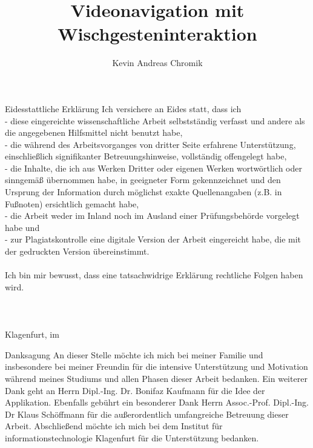 \documentclass[11pt,a4paper]{report}
\begin{document}
\title{Videonavigation mit Wischgesteninteraktion}
\author{Kevin Andreas Chromik}

\maketitle
{}
\begin{preface}{Eidesstattliche Erklärung}
Ich versichere an Eides statt, dass ich\\
- diese eingereichte wissenschaftliche Arbeit selbstständig verfasst und andere als die angegebenen Hilfsmittel nicht benutzt habe,\\
- die während des Arbeitsvorganges von dritter Seite erfahrene Unterstützung, einschließlich signifikanter Betreuungshinweise, vollständig offengelegt habe,\\
- die Inhalte, die ich aus Werken Dritter oder eigenen Werken wortwörtlich oder sinngemäß übernommen habe, in geeigneter Form gekennzeichnet und den Ursprung der Information durch möglichst exakte Quellenangaben (z.B. in Fußnoten) ersichtlich gemacht habe,\\
- die Arbeit weder im Inland noch im Ausland einer Prüfungsbehörde vorgelegt habe und\\
- zur Plagiatskontrolle eine digitale Version der Arbeit eingereicht habe, die mit der gedruckten Version übereinstimmt.
\\\\Ich bin mir bewusst, dass eine tatsachwidrige Erklärung rechtliche Folgen haben wird.\\\\\\\\Klagenfurt, im \finaldate
\end{preface}

\begin{preface}{Danksagung}
An dieser Stelle möchte ich mich bei meiner Familie und insbesondere bei meiner Freundin für die intensive Unterstützung und Motivation während meines Studiums und allen Phasen dieser Arbeit bedanken. Ein weiterer Dank geht an Herrn Dipl.-Ing. Dr. Bonifaz Kaufmann für die Idee der Applikation. Ebenfalls gebührt ein besonderer Dank Herrn Assoc.-Prof. Dipl.-Ing. Dr Klaus Schöffmann für die außerordentlich umfangreiche Betreuung dieser Arbeit.  Abschließend möchte ich mich bei dem Institut für informationstechnologie Klagenfurt für die Unterstützung bedanken.
\end{preface}
\end{document}
